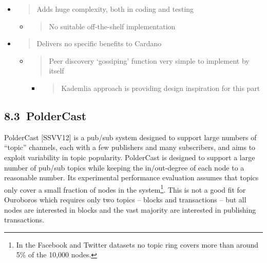 \documentclass[]{article}
\begin{document}
\begin{itemize}
\item
  \begin{quote}
  Adds huge complexity, both in coding and testing
  \end{quote}

  \begin{itemize}
  \item
    \begin{quote}
    No suitable off-the-shelf implementation
    \end{quote}
  \end{itemize}
\item
  \begin{quote}
  Delivers no specific benefits to Cardano
  \end{quote}

  \begin{itemize}
  \item
    \begin{quote}
    Peer discovery `gossiping' function very simple to implement by
    itself
    \end{quote}

    \begin{itemize}
    \item
      \begin{quote}
      Kademlia approach is providing design inspiration for this part
      \end{quote}
    \end{itemize}
  \end{itemize}
\end{itemize}

\hypertarget{poldercast-1}{%
\subsection{​8.3​~PolderCast}\label{poldercast-1}}

PolderCast {[}SSVV12{]} is a pub/sub system designed to support large
numbers of ``topic'' channels, each with a few publishers and many
subscribers, and aims to exploit variability in topic popularity.
PolderCast is designed to support a large number of pub/sub topics while
keeping the in/out-degree of each node to a reasonable number. Its
experimental performance evaluation assumes that topics only cover a
small fraction of nodes in the system\footnote{In the Facebook and
  Twitter datasets no topic ring covers more than around 5\% of the
  10,000 nodes.}. This is not a good fit for Ouroboros which requires
only two topics -- blocks and transactions -- but all nodes are
interested in blocks and the vast majority are interested in publishing
transactions.
\end{document}

